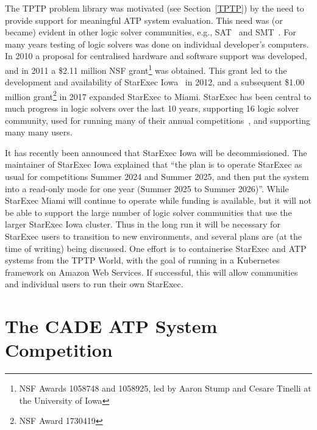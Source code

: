 \documentclass{easychair}
\begin{document}
The TPTP problem library was motivated (see Section~\ref{TPTP}) by the need to provide support
for meaningful ATP system evaluation.
This need was (or became) evident in other logic solver communities, e.g., SAT~\cite{HS00-SATLIB} 
and SMT~\cite{BST10}.
For many years testing of logic solvers was done on individual developer's computers. 
In 2010 a proposal for centralised hardware and software support was developed,
and in 2011 a \$2.11 million NSF grant\footnote{%
NSF Awards 1058748 and 1058925, led by Aaron Stump and Cesare Tinelli at the University of Iowa} 
was obtained.
This grant led to the development and availability of StarExec Iowa~\cite{SST14} in 2012,
and a subsequent \$1.00 million grant\footnote{%
NSF Award 1730419} in 2017 expanded StarExec to Miami.
StarExec has been central to much progress in logic solvers over the last 10 years, supporting
16 logic solver community, used for running many of their annual competitions~\cite{BB+19},
and supporting many many users.

It has recently been announced that StarExec Iowa will be decommissioned. 
The maintainer of StarExec Iowa explained that ``the plan is to operate StarExec as usual for 
competitions Summer 2024 and Summer 2025, and then put the system into a read-only mode for one 
year (Summer 2025 to Summer 2026)''.
While StarExec Miami will continue to operate while funding is available, but it will not be able
to support the large number of logic solver communities that use the larger StarExec Iowa cluster.
Thus in the long run it will be necessary for StarExec users to transition to new environments,
and several plans are (at the time of writing) being discussed.
One effort is to containerise StarExec and ATP systems from the TPTP World, with the goal of
running in a Kubernetes framework on Amazon Web Services.
If successful, this will allow communities and individual users to run their own StarExec.

\section{The CADE ATP System Competition}
\label{CASC}
\end{document}
